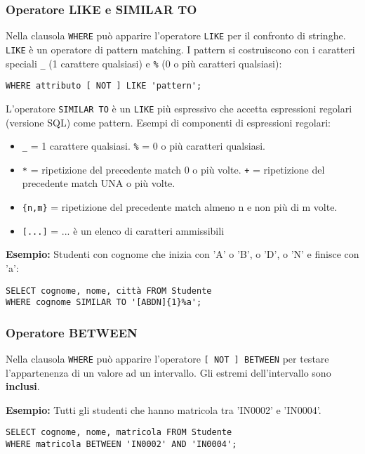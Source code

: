 \documentclass[a4paper, 10pt]{article}
\begin{document}
	\subsubsection{Operatore LIKE e SIMILAR TO}
		Nella clausola \lstinline|WHERE| può apparire l’operatore \lstinline|LIKE| per il confronto di
		stringhe. \lstinline|LIKE| è un operatore di pattern matching. I pattern si costruiscono
		con i caratteri speciali \lstinline|_| (1 carattere qualsiasi) e \lstinline|%| (0 o più caratteri qualsiasi):
		\begin{lstlisting}
WHERE attributo [ NOT ] LIKE 'pattern';
		\end{lstlisting}
		L’operatore \lstinline|SIMILAR TO| è un \lstinline|LIKE| più espressivo che accetta
		espressioni regolari (versione SQL) come pattern. Esempi di componenti di
		espressioni regolari:
		\begin{itemize}
			\item \lstinline|_| = 1 carattere qualsiasi. \lstinline|%| = 0 o più caratteri qualsiasi.
			\item \lstinline|*| = ripetizione del precedente match 0 o più volte. 
				\lstinline|+| = ripetizione del precedente match UNA o più volte.
			\item \lstinline|{n,m}| = ripetizione del precedente match almeno n e non più di m volte.
			\item \lstinline|[...]| = ... è un elenco di caratteri ammissibili
		\end{itemize}
		\textbf{Esempio:} Studenti con cognome che inizia con 'A' o 'B', o 'D', o 'N' e finisce con 'a':
		\begin{lstlisting}
SELECT cognome, nome, città FROM Studente
WHERE cognome SIMILAR TO '[ABDN]{1}%a';
		\end{lstlisting}
		
	\subsubsection{Operatore BETWEEN}
		Nella clausola \lstinline|WHERE| può apparire l’operatore \lstinline|[ NOT ] BETWEEN| per testare
		l’appartenenza di un valore ad un intervallo. Gli estremi dell'intervallo sono \textbf{inclusi}.
		
		\noindent
		\textbf{Esempio:} Tutti gli studenti che hanno matricola tra 'IN0002' e 'IN0004'.
	\begin{lstlisting}
SELECT cognome, nome, matricola FROM Studente
WHERE matricola BETWEEN 'IN0002' AND 'IN0004';
	\end{lstlisting}
	
\end{document}
